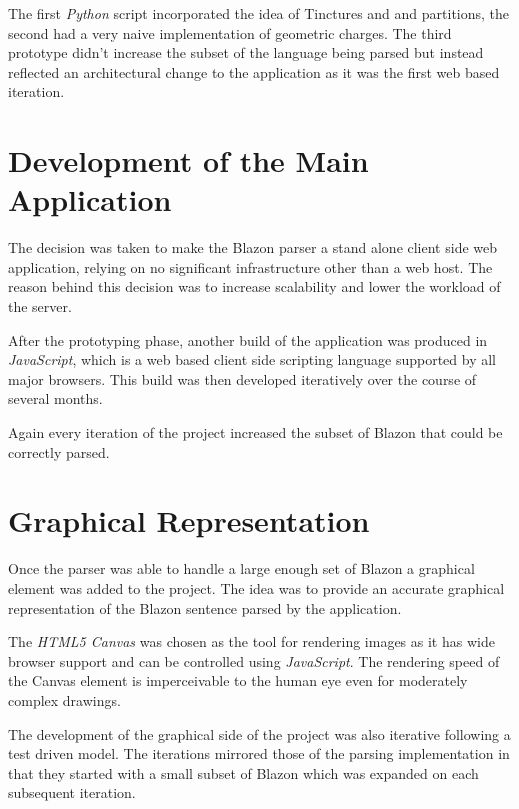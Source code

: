 The first \emph{Python} script incorporated the idea of Tinctures and and partitions, the second had a very naive implementation of geometric charges. The third prototype didn't increase the subset of the language being parsed but instead reflected an architectural change to the application as it was the first web based iteration. 



\section{Development of the Main Application}


The decision was taken to make the Blazon parser a stand alone client side web application, relying on no significant infrastructure other than a web host.  The reason behind this decision was to increase scalability and lower the workload of the server.  

After the prototyping phase, another build of the application was produced in \emph{JavaScript}, which is a web based client side scripting language supported by all major browsers.  This build was then developed iteratively over the course of several months.

Again every iteration of the project increased the subset of Blazon that could be correctly parsed.



\section{Graphical Representation}

Once the parser was able to handle a large enough set of Blazon a graphical element was added to the project.  The idea was to provide an accurate graphical representation of the Blazon sentence parsed by the application.  

The \emph{HTML5 Canvas} was chosen as the tool for rendering images as it has wide browser support and can be controlled using \emph{JavaScript}.  The rendering speed of the Canvas element is imperceivable to the human eye even for moderately complex drawings.  

The development of the graphical side of the project was also iterative following a test driven model.  The iterations mirrored those of the parsing implementation in that they started with a small subset of Blazon which was expanded on each subsequent iteration. 

